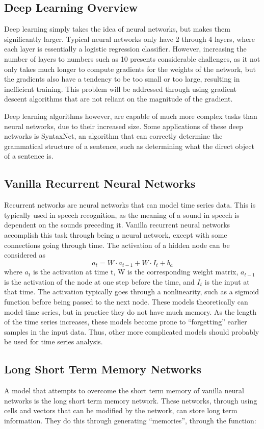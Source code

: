\documentclass{article}
\begin{document}
\subsection{Deep Learning Overview}
Deep learning simply takes the idea of neural networks, but makes them
significantly larger. Typical neural networks only have 2 through 4 layers,
where each layer is essentially a logistic regression classifier. However,
increasing the number of layers to numbers such as 10 presents considerable
challenges, as it not only takes much longer to compute gradients for the
weights of the network, but the gradients also have a tendency to be too small
or too large, resulting in inefficient training. This problem will be addressed
through using gradient descent algorithms that are not reliant on the magnitude
of the gradient.

Deep learning algorithms however, are capable of much more complex tasks than
neural networks, due to their increased size. Some applications of these deep
networks is SyntaxNet, an algorithm that can correctly determine the grammatical
structure of a sentence, such as determining what the direct object of a
sentence is.


\subsection{Vanilla Recurrent Neural Networks}
Recurrent networks are neural networks that can model time series data. This is
typically used in speech recognition, as the meaning of a sound in speech is
dependent on the sounds preceding it. Vanilla recurrent neural networks
accomplish this task through being a neural network, except with some
connections going through time.  The activation of a hidden node can be
considered as $$a_t = W\cdot a_{t-1} + W\cdot I_t + b_a$$ where $a_t$ is the
activation at time t, W is the corresponding weight matrix, $a_{t-1}$ is the
activation of the node at one step before the time, and $I_t$ is the input at
that time. The activation typically goes through a nonlinearity, such as a
sigmoid function before being passed to the next node. These models
theoretically can model time series, but in practice they do not have much
memory. As the length of the time series increases, these models become prone to
``forgetting'' earlier samples in the input data. Thus, other more complicated
models should probably be used for time series analysis.

\subsection{Long Short Term Memory Networks}
A model that attempts to overcome the short term memory of vanilla neural
networks is the long short term memory network. These networks, through using
cells and vectors that can be modified by the network, can store long term
information. They do this through generating ``memories'', through the function:
\end{document}
